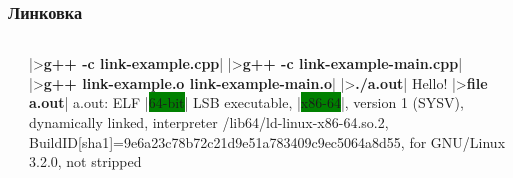 \documentclass[compress]{beamer}
\newcommand{\shellprompt}{>}
\newcommand{\shellcommand}[1]{\shellprompt \space \textbf{#1}}
\begin{document}
\begin{frame}[fragile]

    \frametitle{Линковка}

    \begin{columns}[T]

        \begin{column}{0.4\textwidth}




        \end{column}

        \begin{column}{0.6\textwidth}

            \begin{ConsoleWindow}
|\shellcommand{g++ -c link-example.cpp}|
|\shellcommand{g++ -c link-example-main.cpp}|
|\shellcommand{g++ link-example.o link-example-main.o}|
|\shellcommand{./a.out}|
Hello!
|\shellcommand{file a.out}|
a.out: ELF |\colorbox{green}{64-bit}| LSB executable, |\colorbox{green}{x86-64}|, version 1 (SYSV), dynamically linked, interpreter /lib64/ld-linux-x86-64.so.2, BuildID[sha1]=9e6a23c78b72c21d9e51a783409c9ec5064a8d55, for GNU/Linux 3.2.0, not stripped
            \end{ConsoleWindow}

        \end{column}

    \end{columns}

\end{frame}
\end{document}
